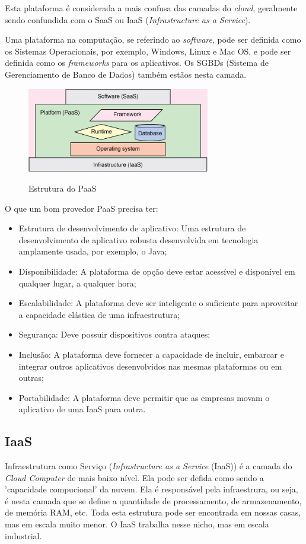 \documentclass{abnt}
\begin{document}
		Esta plataforma é considerada a mais confusa das camadas do \textit{cloud}, geralmente sendo confundida com o SaaS ou IaaS (\textit{Infrastructure as a Service}).
		
		Uma plataforma na computação, se referindo ao \textit{software}, pode ser definida como os Sistemas Operacionais, por exemplo, Windows\texttrademark , Linux e Mac OS, e pode ser definida como os \textit{frameworks} para os aplicativos. Os SGBDs (Sistema de Gerenciamento de Banco de Dados) também estãos nesta camada.
		\newpage
		\begin{figure}[h]
			\centering
			\includegraphics[width=8cm, keepaspectratio]{img/figure1.jpg}
			\label{fig_paas}
			\caption{Estrutura do PaaS}
		\end{figure}
		O que um bom provedor PaaS precisa ter:
			\begin{itemize}
		    \item Estrutura de desenvolvimento de aplicativo: Uma estrutura de desenvolvimento de aplicativo robusta desenvolvida em tecnologia amplamente usada, por exemplo, o Java;
            \item Disponibilidade: A plataforma de opção deve estar acessível e disponível em qualquer lugar, a qualquer hora;
            \item Escalabilidade: A plataforma deve ser inteligente o suficiente para aproveitar a capacidade elástica de uma infraestrutura;
            \item Segurança: Deve possuir dispositivos contra ataques;
            \item Inclusão: A plataforma deve fornecer a capacidade de incluir, embarcar e integrar outros aplicativos desenvolvidos nas mesmas plataformas ou em outras;
            \item Portabilidade: A plataforma deve permitir que as empresas movam o aplicativo de uma IaaS para outra.
		\end{itemize}
	\subsection{IaaS}
		Infraestrutura como Serviço (\textit{Infrastructure as a Service} (IaaS)) é a camada do \textit{Cloud Computer} de mais baixo nível. Ela pode ser defida como sendo a 'capacidade compucional' da nuvem. Ela é responsável pela infraestrura, ou seja, é nesta camada que se define a quantidade de processamento, de armazenamento, de memória RAM, etc. Toda esta estrutura pode ser encontrada em nossas casas, mas em escala muito menor. O IaaS trabalha nesse nicho, mas em escala industrial.
		
\end{document}
